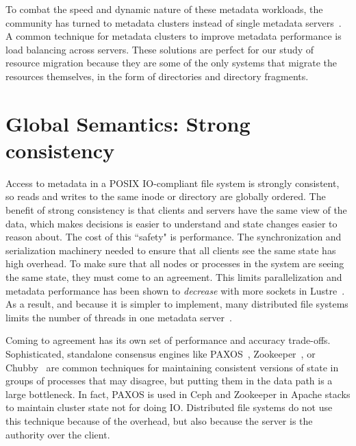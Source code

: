 To combat the speed and dynamic nature of these metadata workloads, the
community has turned to metadata clusters instead of single metadata
servers~\cite{patil:fast2011-giga+,weil:osdi2006-ceph,weil:sc2004-dyn-metadata,
sinnamohideen:atc2010-ursa, xing:sc2009-skyfs}.  A common technique for
metadata clusters to improve metadata performance is load balancing across
servers. These solutions are perfect for our study of resource migration
because they are some of the only systems that migrate the resources
themselves, in the form of directories and directory fragments. 


\section{Global Semantics: Strong consistency}

Access to metadata in a POSIX IO-compliant file system is strongly consistent,
so reads and writes to the same inode or directory are globally ordered.  The
benefit of strong consistency is that clients and servers have the same view of
the data, which makes decisions is easier to understand and state changes
easier to reason about.  The cost of this ``safety" is performance.  The
synchronization and serialization machinery needed to ensure that all clients
see the same state has high overhead.  To make sure that all nodes or processes
in the system are seeing the same state, they must come to an agreement.  This
limits parallelization and metadata performance has been shown to {\it
decrease} with more sockets in
Lustre~\cite{konstantinos:pdsw2014-lustre-metadata}. As a result, and because
it is simpler to implement, many distributed file systems limits the number of
threads in one metadata server~\cite{weil:osdi2006-ceph,
alam:pdsw2011-metadata-scaling, ren:sc2014-indexfs}. 

Coming to agreement has its own set of performance and accuracy trade-offs.
Sophisticated, standalone consensus engines like
PAXOS~\cite{lamport_parttime_1998}, Zookeeper~\cite{hunt_zookeeper_2010}, or
Chubby~\cite{burrows_chubby_2006} are common techniques for maintaining
consistent versions of state in groups of processes that may disagree, but
putting them in the data path is a large bottleneck. In fact, PAXOS is used in
Ceph and Zookeeper in Apache stacks to maintain cluster state not for doing IO.
Distributed file systems do not use this technique because of the overhead, but
also because the server is the authority over the client.

